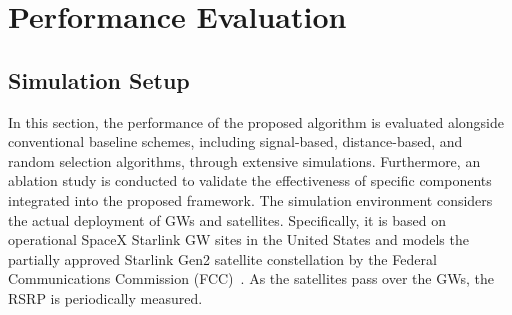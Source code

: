 \chapter[Performance Evaluation]{Performance Evaluation}

\section{Simulation Setup}
\quad In this section, the performance of the proposed algorithm is evaluated alongside conventional baseline schemes, including signal-based, distance-based, and random selection algorithms, through extensive simulations. Furthermore, an ablation study is conducted to validate the effectiveness of specific components integrated into the proposed framework. The simulation environment considers the actual deployment of GWs and satellites. Specifically, it is based on operational SpaceX Starlink GW sites in the United States and models the partially approved Starlink Gen2 satellite constellation by the Federal Communications Commission (FCC)~\cite{FCC2020, FCC22-91}. As the satellites pass over the GWs, the RSRP is periodically measured.
